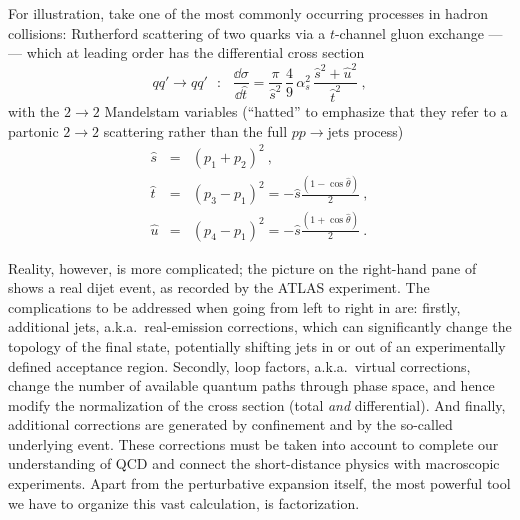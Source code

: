 For illustration, take one of the
most commonly occurring processes in hadron collisions:
Rutherford scattering of two quarks via a $t$-channel gluon exchange
---  --- which at leading order 
has the differential cross section
\begin{equation}
qq'\to qq' ~~~:~~~\frac{\dd{\sigma}}{\dd{\hat{t}}} =
\frac{\pi}{\hat{s}^2}\, \frac{4}{9}\,
\alpha_s^2\, \frac{\hat{s}^2 + \hat{u}^2}{\hat{t}^2}~,
\end{equation}
with the $2\to 2$ Mandelstam variables (``hatted'' to emphasize that
they refer to a partonic $2\to 2$ scattering rather than the full
$pp\to\mbox{jets}$
process)
\begin{eqnarray}
\hat{s} & = & (p_1+p_2)^2 ~,\\[1.5mm]
\hat{t} & = &(p_3-p_1)^2 = -\hat{s}\frac{(1-\cos\hat\theta)}{2} ~,\\
\hat{u} & = &(p_4-p_1)^2 = -\hat{s}\frac{(1+\cos\hat\theta)}{2}~.
\end{eqnarray}

Reality, however, is more complicated; the picture on the right-hand pane of
 shows a real dijet event, as recorded by the
ATLAS experiment.  
The complications to be addressed when going from left to right in
 are: 
firstly, additional jets, a.k.a.\ real-emission corrections, 
which can significantly change the topology of the final state, potentially
shifting jets in or out of an experimentally defined acceptance
region. Secondly, loop factors, a.k.a.\ virtual corrections, change
the number of 
 available quantum paths through phase space, and hence modify 
the normalization of the cross section (total \emph{and}
differential). And finally, additional corrections are generated by
confinement and by the so-called  underlying event. These corrections 
must be taken into account to complete our understanding of QCD and
connect the short-distance physics with macroscopic experiments.  
Apart from the perturbative expansion itself, the most powerful tool
we have to organize this vast calculation, is factorization. 

%

